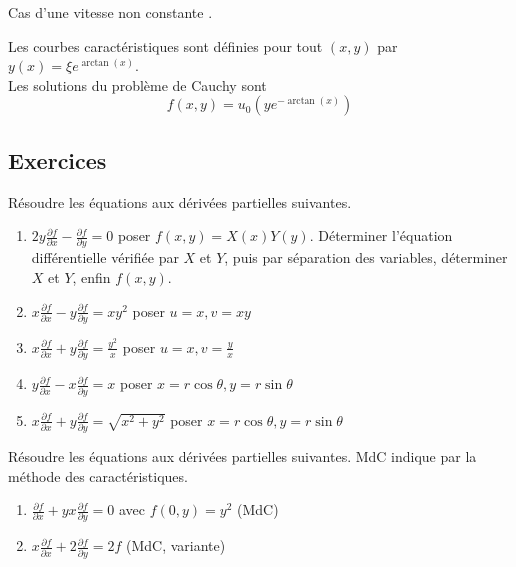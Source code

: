\documentclass[12pt]{article}
\newcounter{exercice}
\newcounter{remarque}
\begin{document}
\begin{remarque}
Cas d'une \og  vitesse non constante \fg{} .
\end{remarque}

\begin{corrige}
Les courbes caractéristiques sont définies pour tout $(x, y)$ par $y(x) = \xi e^{\arctan(x)}$.\\
Les solutions du problème de Cauchy sont
$$
f(x, y) = u_{0}\left(y e^{-\arctan(x)}\right)
$$
\end{corrige}

\subsection{Exercices}

\begin{exercice}
Résoudre les équations aux dérivées partielles suivantes.
\begin{enumerate}
  \item $2y \frac{\partial f}{\partial x} - \frac{\partial f}{\partial y} = 0$ poser $f(x, y) = X(x) Y(y)$. Déterminer l'équation différentielle vérifiée par $X$ et $Y$, puis par séparation des variables, déterminer $X$ et $Y$, enfin $f(x, y)$.
  \item $x \frac{\partial f}{\partial x} - y \frac{\partial f}{\partial y} = xy^{2}$ poser $u = x, v = xy$
  \item $x \frac{\partial f}{\partial x} + y \frac{\partial f}{\partial y} = \frac{y^{2}}{x}$ poser $u = x, v = \frac{y}{x}$
  \item $y \frac{\partial f}{\partial x} - x \frac{\partial f}{\partial y} = x$ poser $x = r \cos \theta, y = r \sin \theta$
  \item $x \frac{\partial f}{\partial x} + y \frac{\partial f}{\partial y} = \sqrt{x^{2}+y^{2}}$ poser $x = r \cos \theta, y = r \sin \theta$
\end{enumerate}
\end{exercice}

\begin{exercice}
Résoudre les équations aux dérivées partielles suivantes. MdC indique par la méthode des caractéristiques.
\begin{enumerate}
  \item $\frac{\partial f}{\partial x} + yx \frac{\partial f}{\partial y} = 0$ avec $f(0, y) = y^{2}$ (MdC)
  \item $x \frac{\partial f}{\partial x} + 2 \frac{\partial f}{\partial y} = 2f$ (MdC, variante)
\end{enumerate}
\end{exercice}
\end{document}
